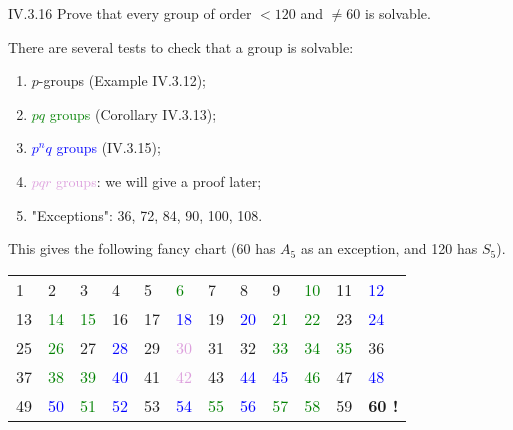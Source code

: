 \begin{problem}{IV.3.16}
Prove that every group of order $<120$ and $\neq 60$ is solvable.
\end{problem}
\begin{pf}
There are several tests to check that a group is solvable:
\begin{enumerate}[label=(\roman*)]
\setlength\itemsep{0pt}
\item \textcolor{BrickRed}{$p$-groups} (Example IV.3.12);
\item \textcolor{green}{$pq$ groups} (Corollary IV.3.13);
\item \textcolor{blue}{$p^nq$ groups} (IV.3.15);
\item \textcolor{Plum}{$pqr$ groups}: we will give a proof later;
\item "Exceptions": 36, 72, 84, 90, 100, 108.
\end{enumerate}
This gives the following fancy chart (60 has $A_5$ as an exception, and 120 has $S_5$). 
\begin{center}
\begin{tabular}{llllllllllll}
\textcolor{BrickRed}{1} &\textcolor{BrickRed}{2} &\textcolor{BrickRed}{3} &\textcolor{BrickRed}{4} &\textcolor{BrickRed}{5} &\textcolor{green}{6} &\textcolor{BrickRed}{7} &\textcolor{BrickRed}{8} &\textcolor{BrickRed}{9} &\textcolor{green}{10} &\textcolor{BrickRed}{11} &\textcolor{blue}{12} \\
\textcolor{BrickRed}{13} &\textcolor{green}{14} &\textcolor{green}{15} &\textcolor{BrickRed}{16} &\textcolor{BrickRed}{17} &\textcolor{blue}{18} &\textcolor{BrickRed}{19} &\textcolor{blue}{20} &\textcolor{green}{21} &\textcolor{green}{22} &\textcolor{BrickRed}{23} &\textcolor{blue}{24} \\
\textcolor{BrickRed}{25} &\textcolor{green}{26} &\textcolor{BrickRed}{27} &\textcolor{blue}{28} &\textcolor{BrickRed}{29} &\textcolor{Plum}{30} &\textcolor{BrickRed}{31} &\textcolor{BrickRed}{32} &\textcolor{green}{33} &\textcolor{green}{34} &\textcolor{green}{35} &36 \\
\textcolor{BrickRed}{37} &\textcolor{green}{38} &\textcolor{green}{39} &\textcolor{blue}{40} &\textcolor{BrickRed}{41} &\textcolor{Plum}{42} &\textcolor{BrickRed}{43} &\textcolor{blue}{44} &\textcolor{blue}{45} &\textcolor{green}{46} &\textcolor{BrickRed}{47} &\textcolor{blue}{48} \\
\textcolor{BrickRed}{49} &\textcolor{blue}{50} &\textcolor{green}{51} &\textcolor{blue}{52} &\textcolor{BrickRed}{53} &\textcolor{blue}{54} &\textcolor{green}{55} &\textcolor{blue}{56} &\textcolor{green}{57} &\textcolor{green}{58} &\textcolor{BrickRed}{59} &\textbf{60 !} \\

\end{tabular}
\end{center}
\end{pf}

